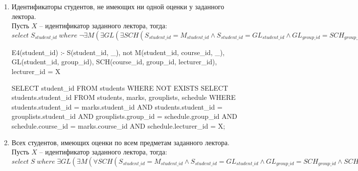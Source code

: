 \documentclass[10pt, a4paper]{article}
\begin{document}
\begin{enumerate}
{	\begin{prolog}
E3(student_id, student_name) :- S(student_id, student_name),
	M(student_id, course_id, _), GL(student_id, group_id),
	SCH(course_id, group_id, lecturer_id), lecturer_id = X
	\end{prolog}

	\begin{sql}
SELECT * FROM students
WHERE EXISTS
SELECT student_id, student_name
	FROM students, marks, grouplists, schedule
	WHERE student.student_id = marks.student_id AND
		students.student_id = grouplists.student_id AND
		grouplists.group_id = schedule.group_id AND
		schedule.course_id = marks.course_id AND
		schedule.lecturer_id = X;
	\end{sql}
	}

	\item {Идентификаторы студентов, не имеющих ни одной оценки у заданного лектора.\\
	Пусть $X$ -- идентификатор заданного лектора, тогда:\\
	$select \; S_{student\_id} \; where \; \neg \exists M (\exists GL (\exists SCH (S_{student\_id} = M_{student\_id} \wedge S_{student\_id} = GL_{student\_id} \wedge GL_{group\_id} = SCH_{group\_id} \wedge M_{course\_id} = SCH_{course\_id} \wedge SCH_{lecturer\_id = X})))$

	\begin{prolog}
E4(student_id) :- S(student_id, _), not M(student_id, course_id, _),
	GL(student_id, group_id), SCH(course_id, group_id, lecturer_id),
	lecturer_id = X
	\end{prolog}

	\begin{sql}
SELECT student_id FROM students
WHERE NOT EXISTS
SELECT students.student_id
	FROM students, marks, grouplists, schedule
	WHERE students.student_id = marks.student_id AND
		students.student_id = grouplists.student_id AND
		grouplists.group_id = schedule.group_id AND
		schedule.course_id = marks.course_id AND
		schedule.lecturer_id = X;
	\end{sql}
	}

	\item {Всех студентов, имеющих оценки по всем предметам заданного лектора.\\
	Пусть $X$ -- идентификатор заданного лектора, тогда:\\
	$select \; S \; where \; \exists GL (\exists M (\forall SCH (S_{student\_id} = M_{student\_id} \wedge S_{student\_id} = GL_{student\_id} \wedge GL_{group\_id} = SCH_{group\_id} \wedge SCH_{course\_id} = M_{course\_id} \wedge SCH_{lecturer\_id} = X)))$

}
\end{enumerate}
\end{document}
